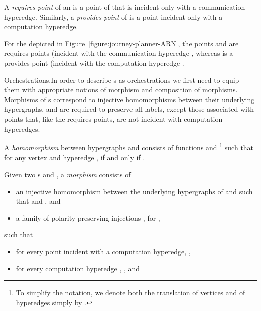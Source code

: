 \documentclass{LMCS}
\begin{document}
  \begin{defi}
    A \emph{requires-point} of an   is a point of  that is incident only with a communication hyperedge.
    Similarly, a \emph{provides-point} of  is a point incident only with a computation hyperedge.
  \end{defi}

  \noindent For the   depicted in Figure~\ref{figure:journey-planner-ARN}, the points  and  are requires-points (incident with the communication hyperedge , whereas  is a provides-point (incident with the computation hyperedge .

  \begin{minisection}{Orchestrations.}In order to describe s as orchestrations we first need to equip them with appropriate notions of morphism and composition of morphisms.
    Morphisms of s correspond to injective homomorphisms between their underlying hypergraphs, and are required to preserve all labels, except those associated with points that, like the requires-points, are not incident with computation hyperedges.

    \begin{defi}
      A \emph{homomorphism}  between hypergraphs  and  consists of functions  and \footnote{To simplify the notation, we denote both the translation of vertices and of hyperedges simply by .} such that for any vertex  and hyperedge ,  if and only if .
    \end{defi}

    \begin{defi}
      Given two s  and , a \emph{morphism}  consists of
      \begin{itemize}
        
      \item an injective homomorphism  between the underlying hypergraphs of  and  such that  and , and
        
      \item a family  of polarity-preserving injections , for ,
        
      \end{itemize}
      such that
      \begin{itemize}

      \item for every point  incident with a computation hyperedge, ,
        
      \item for every computation hyperedge , , and
        

\end{itemize}
\end{defi}
\end{minisection}
\end{document}
